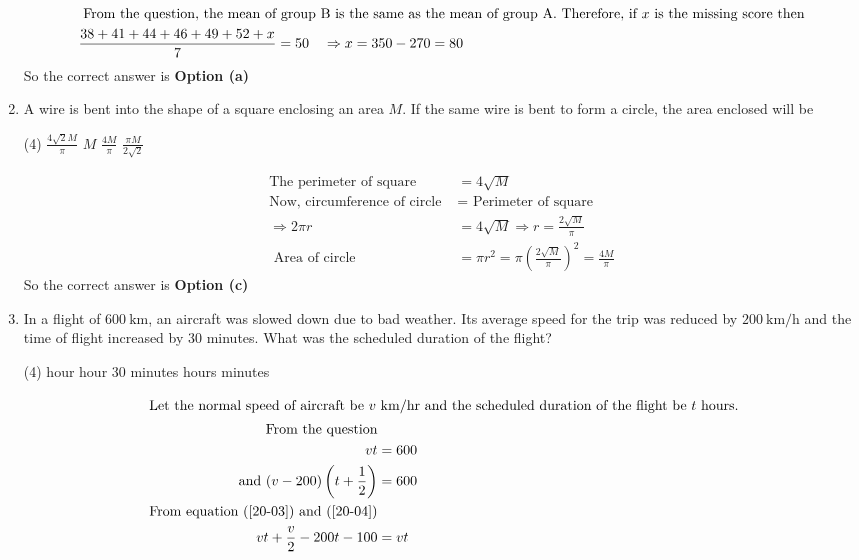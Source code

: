 \begin{enumerate}
\begin{answer}
\begin{align*}
\intertext{	From the question, the mean of group B is the same as the mean of group A. Therefore, if $x$ is the missing score then}
	\frac{38+41+44+46+49+52+x}{7}&=50 \quad \Rightarrow x=350-270=80
	\end{align*}
		So the correct answer is \textbf{Option (a)}
\end{answer}
\item  A wire is bent into the shape of a square enclosing an area $M$. If the same wire is bent to form a circle, the area enclosed will be
 \begin{tasks}(4)
	\task[\textbf{a.}]$\frac{4 \sqrt{2} M}{\pi}$
	\task[\textbf{b.}]$M$
	\task[\textbf{c.}] $\frac{4 M}{\pi}$
	\task[\textbf{d.}] $\frac{\pi M}{2 \sqrt{2}}$
\end{tasks}
\begin{answer}
	\begin{align*}
\text{The perimeter of square }&=4 \sqrt{M}\\
	\text{Now, circumference of circle }&=\text{ Perimeter of square}\\
	\Rightarrow 2 \pi r&=4 \sqrt{M} \Rightarrow r=\frac{2 \sqrt{M}}{\pi}\\
\text{	Area of circle }&=\pi r^{2}=\pi\left(\frac{2 \sqrt{M}}{\pi}\right)^{2}=\frac{4 M}{\pi}
	\end{align*}
		So the correct answer is \textbf{Option (c)}
\end{answer}
\item  In a flight of $600 \mathrm{~km}$, an aircraft was slowed down due to bad weather. Its average speed for the trip was reduced by $200 \mathrm{~km} / \mathrm{h}$ and the time of flight increased by 30 minutes. What was the scheduled duration of the flight?
 \begin{tasks}(4)
	 hour
	 hour 30 minutes
	 hours
	 minutes
\end{tasks}	
\begin{answer}
	\begin{align}
	\intertext{ Let the normal speed of aircraft be $v \mathrm{~km} / \mathrm{hr}$ and the scheduled duration of the flight be $t$ hours.}
\text{	From the question}\notag\\
	v t&=600\label{20-03}\\
\text{	and }(v-200)\left(t+\frac{1}{2}\right)&=600\label{20-04}\\
\text{	From equation (\ref{20-03}) and (\ref{20-04})}\notag\\
	v t+\frac{v}{2}-200 t-100&=v t \notag\\

\end{align}
\end{answer}
\end{enumerate}
